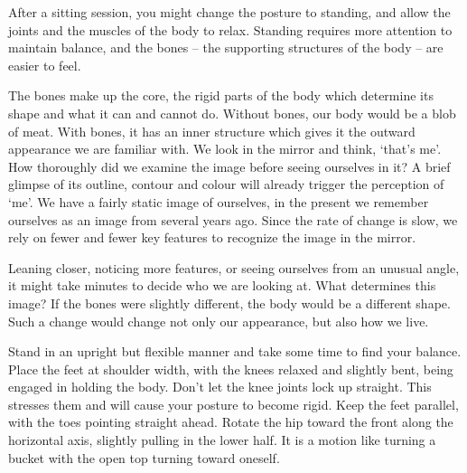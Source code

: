 
\enlargethispage*{2\baselineskip}

After a sitting session, you might change the posture to standing, and
allow the joints and the muscles of the body to relax. Standing requires
more attention to maintain balance, and the bones -- the supporting
structures of the body -- are easier to feel.

The bones make up the core, the rigid parts of the body which determine
its shape and what it can and cannot do. Without bones, our body would
be a blob of meat. With bones, it has an inner structure which gives it
the outward appearance we are familiar with. We look in the mirror and
think, `that's me'. How thoroughly did we examine the image before
seeing ourselves in it? A brief glimpse of its outline, contour and
colour will already trigger the perception of `me'. We have a fairly
static image of ourselves, in the present we remember ourselves as an
image from several years ago. Since the rate of change is slow, we rely
on fewer and fewer key features to recognize the image in the mirror.

\clearpage
\thispagestyle{empty}\mbox{}
\clearpage

Leaning closer, noticing more features, or seeing ourselves from an
unusual angle, it might take minutes to decide who we are looking at.
What determines this image? If the bones were slightly different, the
body would be a different shape. Such a change would change not only our
appearance, but also how we live.


Stand in an upright but flexible manner and take some time to find your
balance. Place the feet at shoulder width, with the knees relaxed and
slightly bent, being engaged in holding the body. Don't let the knee
joints lock up straight. This stresses them and will cause your posture
to become rigid. Keep the feet parallel, with the toes pointing straight
ahead. Rotate the hip toward the front along the horizontal axis,
slightly pulling in the lower half. It is a motion like turning a bucket
with the open top turning toward oneself.

